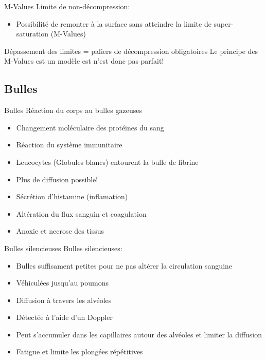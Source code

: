 \begin{frame}{M-Values}
	Limite de non-décompression:
	\begin{itemize}
		\item Possibilité de remonter à la surface sans atteindre la limite de super-saturation (M-Values)
	\end{itemize}
	\vfill
	Dépassement des limites = paliers de décompression obligatoires
	\vfill
	Le principe des M-Values est un modèle est n'est donc pas parfait!
\end{frame}

\subsection{Bulles}
\begin{frame}{Bulles}
	Réaction du corps au bulles gazeuses
	\begin{itemize}
		\item Changement moléculaire des protéines du sang
		\item Réaction du système immunitaire
		\item Leucocytes (Globules blancs) entourent la bulle de fibrine
		\item Plus de diffusion possible!
		\item Sécrétion d'histamine (inflamation)
		\item Altération du flux sanguin et coagulation
		\item Anoxie et necrose des tissus
	\end{itemize}
\end{frame}

\begin{frame}{Bulles silencieuses}  
	Bulles silencieuses:
	\begin{itemize}
		\item Bulles suffisament petites pour ne pas altérer la circulation sanguine
		\item Véhiculées jusqu'au poumons
		\item Diffusion à travers les alvéoles
		\item Détectée à l'aide d'un Doppler
		\item Peut s'accumuler dans les capillaires autour des alvéoles et limiter la diffusion
		\item Fatigue et limite les plongées répétitives
	\end{itemize}
\end{frame}

